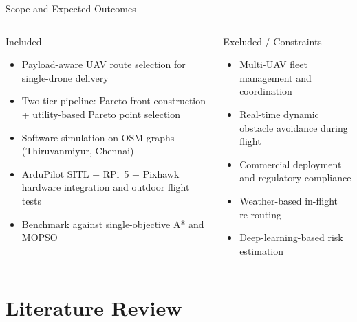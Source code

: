 \documentclass[aspectratio=169,11pt]{beamer}
\begin{document}
\begin{frame}{Scope and Expected Outcomes}
  \begin{columns}[T,onlytextwidth]
      \begin{block}{Included}
        \begin{itemize}
          \item Payload-aware UAV route selection for single-drone delivery
          \item Two-tier pipeline: Pareto front construction + utility-based
                Pareto point selection
          \item Software simulation on OSM graphs
                (Thiruvanmiyur, Chennai)
          \item ArduPilot SITL + RPi~5 + Pixhawk hardware integration and
                outdoor flight tests
          \item Benchmark against single-objective A* and MOPSO
        \end{itemize}
      \end{block}
      \begin{block}{Excluded / Constraints}
        \begin{itemize}
          \item Multi-UAV fleet management and coordination
          \item Real-time dynamic obstacle avoidance during flight
          \item Commercial deployment and regulatory compliance
          \item Weather-based in-flight re-routing
          \item Deep-learning-based risk estimation
        \end{itemize}
      \end{block}
  \end{columns}
\end{frame}

\section{Literature Review}
\end{document}
